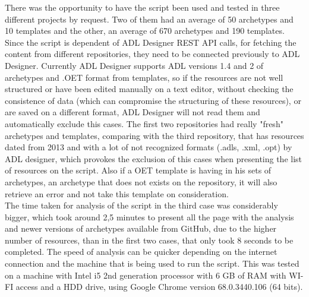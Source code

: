 \documentclass[mim_thesis.tex]{subfiles}
\begin{document}
There was the opportunity to have the script been used and tested in three different projects by request. Two of them had an average of 50 archetypes and 10 templates and the other, an average of 670 archetypes and 190 templates. Since the script is dependent of ADL Designer REST API calls, for fetching the content from different repositories, they need to be connected previously to ADL Designer. Currently ADL Designer supports ADL versions 1.4 and 2 of archetypes and .OET format from templates, so if the resources are not well structured or have been edited manually on a text editor, without checking the consistence of data (which can compromise the structuring of these resources), or are saved on a different format, ADL Designer will not read them and automatically exclude this cases. The first two repositories had really "fresh" archetypes and templates, comparing with the third repository, that has resources dated from 2013 and with a lot of not recognized formats (.adls, .xml, .opt) by ADL designer, which provokes the exclusion of this cases when presenting the list of resources on the script. Also if a OET template is having in his sets of archetypes, an archetype that does not exists on the repository, it will also retrieve an error and not take this template on consideration. \\

The time taken for analysis of the script in the third case was considerably bigger, which took around 2,5 minutes to present all the page with the analysis and newer versions of archetypes available from GitHub, due to the higher number of resources, than in the first two cases, that only took 8 seconds to be completed. The speed of analysis can be quicker depending on the internet connection and the machine that is being used to run the script. This was tested on a machine with Intel i5 2nd generation processor with 6 GB of RAM with WI-FI access and a HDD drive, using Google Chrome version 68.0.3440.106 (64 bits).
\end{document}
